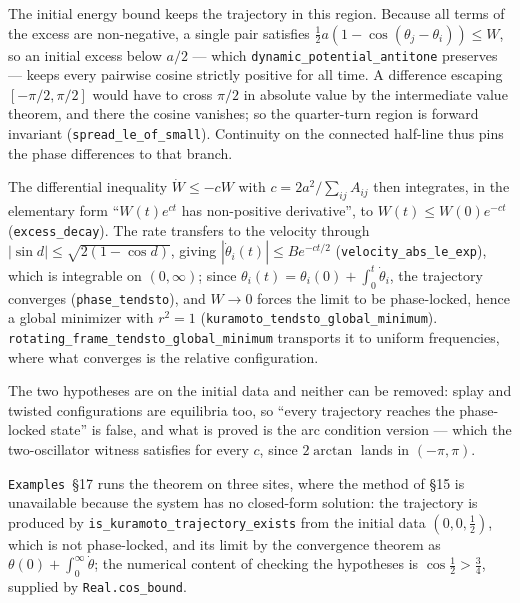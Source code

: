 \documentclass{article}
\begin{document}
The initial energy bound keeps the trajectory in this region. Because all terms of the excess are non-negative, a single pair satisfies $\tfrac12 a(1-\cos(\theta_j - \theta_i)) \le W$, so an initial excess below $a/2$ --- which \nolinkurl{dynamic_potential_antitone} preserves --- keeps every pairwise cosine strictly positive for all time. A difference escaping $[-\pi/2,\pi/2]$ would have to cross $\pi/2$ in absolute value by the intermediate value theorem, and there the cosine vanishes; so the quarter-turn region is forward invariant (\nolinkurl{spread_le_of_small}). Continuity on the connected half-line thus pins the phase differences to that branch.

The differential inequality $\dot W \le -cW$ with $c = 2a^2/\sum_{ij}A_{ij}$ then integrates, in the elementary form ``$W(t)e^{ct}$ has non-positive derivative'', to $W(t) \le W(0)e^{-ct}$ (\nolinkurl{excess_decay}). The rate transfers to the velocity through $|\sin d| \le \sqrt{2(1-\cos d)}$, giving $|\dot\theta_i(t)| \le Be^{-ct/2}$ (\nolinkurl{velocity_abs_le_exp}), which is integrable on $(0,\infty)$; since $\theta_i(t) = \theta_i(0) + \int_0^t\dot\theta_i$, the trajectory converges (\nolinkurl{phase_tendsto}), and $W \to 0$ forces the limit to be phase-locked, hence a global minimizer with $r^2 = 1$ (\nolinkurl{kuramoto_tendsto_global_minimum}). \nolinkurl{rotating_frame_tendsto_global_minimum} transports it to uniform frequencies, where what converges is the relative configuration.

The two hypotheses are on the initial data and neither can be removed: splay and twisted configurations are equilibria too, so ``every trajectory reaches the phase-locked state'' is false, and what is proved is the arc condition version --- which the two-oscillator witness satisfies for every $c$, since $2\arctan$ lands in $(-\pi,\pi)$.

\texttt{Examples}~\S17 runs the theorem on three sites, where the method of \S15 is unavailable because the system has no closed-form solution: the trajectory is produced by \nolinkurl{is_kuramoto_trajectory_exists} from the initial data $(0,0,\tfrac12)$, which is not phase-locked, and its limit by the convergence theorem as $\theta(0) + \int_0^\infty\dot\theta$; the numerical content of checking the hypotheses is $\cos\tfrac12 > \tfrac34$, supplied by \nolinkurl{Real.cos_bound}.
\end{document}
